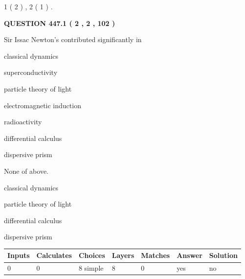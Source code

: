\documentclass[12pt]{article}
\begin{document}
   
   1 ( 2 )
 ,
   2 ( 1 )
 .
  
\vspace{0.2in}
  
{\textbf{\Large{QUESTION
447.1 
 ( 2 , 2 , 102 )
}}}
  
  
Sir Issac Newton's contributed significantly in
 
 
classical dynamics
 
 
superconductivity
 
 
particle theory of light
 
 
electromagnetic induction
 
 
radioactivity
 
 
differential calculus
 
 
dispersive prism
 
 
 None of above.
 
 
\noindent{}
 
 
classical dynamics
 
 
particle theory of light
 
 
differential calculus
 
 
dispersive prism
 
 
\noindent{}
 
 
   
   
   
   
\noindent\begin{tabular}{|l|l|l|l|l|l|l|}
 \hline
Inputs & Calculates & Choices & Layers & Matches & Answer & Solution \\ \hline
 0  & 
 0  & 
 8
  simple  
  & 
 8  & 
 0  & 
  yes & 
  no 
  \\ \hline
 \end{tabular}
   
   
   
   
\noindent{}
   
   
   
\end{document}
